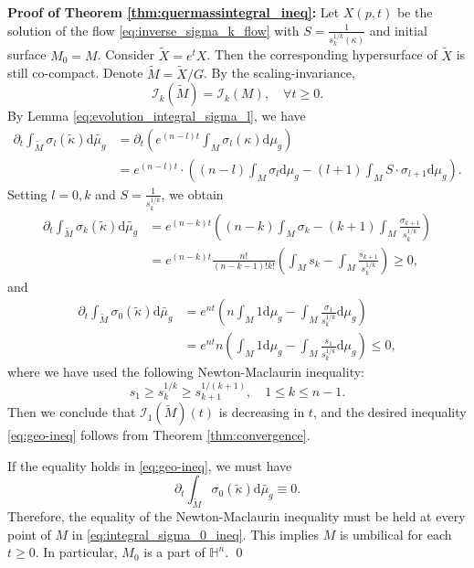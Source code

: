\documentclass[reqno]{amsart}
\theoremstyle{remark}
\newcommand{\dd}{\ensuremath{\text{d}}}
\renewcommand{\H}{{\mathbb{H}}}
\theoremstyle{definition}
\numberwithin{equation}{section}
\begin{document}
\par {\bf Proof of Theorem \ref{thm:quermassintegral_ineq}:} Let \(X(p,t)\) be the solution of the flow \eqref{eq:inverse_sigma_k_flow} with \(S = \frac{1}{s_k^{1/k}(\kappa)}\) and initial surface \(M_0 = M\). Consider \(\widetilde{X} = e^{t}X\). Then the corresponding hypersurface of \(\widetilde{X}\) is still co-compact. Denote \(\widetilde{M} = \widetilde{X} / G\). By the scaling-invariance, 
\[ \mathcal{I}_k(\widetilde{M}) = \mathcal{I}_k(M), \quad \forall t \geq 0. \]
By Lemma \ref{eq:evolution_integral_sigma_l}, we have
\begin{equation}
    \begin{aligned}
        \partial_t \int_{\widetilde{M}} \sigma_l(\widetilde{\kappa}) \dd \widetilde{\mu_g} &= \partial_t \left( e^{(n-l)t}\int_{M} \sigma_l(\kappa) \dd \mu_g \right) \\
        &= e^{(n-l)t}\cdot \left((n-l)\int_M \sigma_l \dd \mu_g - (l+1)\int_{M}S\cdot \sigma_{l+1} \dd \mu_g \right).
    \end{aligned}
\end{equation}
Setting \(l=0,k\) and \(S = \frac{1}{s_k^{1/k}}\), we obtain
\begin{equation}
\begin{aligned}
    \partial_t \int_{\widetilde{M}} \sigma_k(\widetilde{\kappa}) \dd \widetilde{\mu_g} &= e^{(n-k)t}\left( (n-k)\int_{M}\sigma_k - (k+1) \int_{M}\frac{\sigma_{k+1}}{s_k^{1/k}} \right) \\
    &= e^{(n-k)t}\frac{n!}{(n-k-1)!k!}\left( \int_{M}s_k - \int_{M}\frac{s_{k+1}}{s_k^{1/k}} \right) \geq 0,
\end{aligned}
\end{equation}
and 
\begin{equation}\label{eq:integral_sigma_0_ineq}
    \begin{aligned}
        \partial_t \int_{\widetilde{M}} \sigma_0(\widetilde{\kappa}) \dd \widetilde{\mu_g} &= e^{nt}\left( n\int_M 1\dd\mu_g - \int_M \frac{\sigma_1}{s_k^{1/k}}\dd \mu_g \right) \\
        &= e^{nt}n\left( \int_M 1\dd\mu_g  - \int_M \frac{s_1}{s_k^{1/k}}\dd \mu_g \right) \leq 0,
    \end{aligned}
\end{equation}
where we have used the following Newton-Maclaurin inequality:
\[ s_1 \geq s_k^{1/k} \geq s_{k+1}^{1/(k+1)},\quad 1\leq k \leq n-1 . \]
Then we conclude that \(\mathcal{I}_1(\widetilde{M})(t)\) is decreasing in \(t\), and the desired inequality \eqref{eq:geo-ineq} follows from Theorem \ref{thm:convergence}. 
\par If the equality holds in \eqref{eq:geo-ineq}, we must have 
\[ \partial_t \int_{\widetilde{M}} \sigma_0(\widetilde{\kappa}) \dd \widetilde{\mu_g} \equiv 0. \]
Therefore, the equality of the Newton-Maclaurin inequality must be held at every point of \(M\) in \eqref{eq:integral_sigma_0_ineq}. This implies \(M\) is umbilical for each \(t \geq 0\). In particular, \(M_0\) is a part of \(\H^n\). \qed
\end{document}
